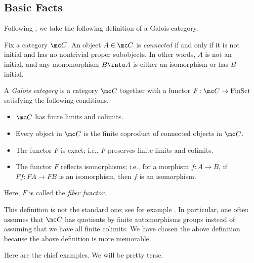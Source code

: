 \documentclass{amsart}
\begin{document}
\subsection{Basic Facts}
Following \cite[\href{https://stacks.math.columbia.edu/tag/0BMY}{Definition 0BMY}]{stacks}, we take the following definition of a Galois category.
\begin{definition}[connected]
    Fix a category $\mc C$. An object $A\in\mc C$ is \textit{connected} if and only if it is not initial and has no nontrivial proper subobjects. In other words, $A$ is not an initial, and any monomorphism $B\into A$ is either an isomorphism or has $B$ initial.
\end{definition}
\begin{definition} \label{def:galois-cat}
    A \textit{Galois category} is a category $\mc C$ together with a functor $F\colon\mc C\to\mathrm{FinSet}$ satisfying the following conditions.
    \begin{itemize}
        \item $\mc C$ has finite limits and colimits.
        \item Every object in $\mc C$ is the finite coproduct of connected objects in $\mc C$.
        \item The functor $F$ is exact; i.e., $F$ preserves finite limits and colimits.
        \item The functor $F$ reflects isomorphisms; i.e., for a morphism $f\colon A\to B$, if $Ff\colon FA\to FB$ is an isomorphism, then $f$ is an isomorphism.
    \end{itemize}
    Here, $F$ is called the \textit{fiber functor}.
\end{definition}
\begin{remark}
    This definition is not the standard one; see for example \cite[Definition~2.1]{cadoret-galois}. In particular, one often assumes that $\mc C$ has quotients by finite automorphisms groups instead of assuming that we have all finite colimits.
    We have chosen the above definition because the above definition is more memorable.
\end{remark}
Here are the chief examples. We will be pretty terse.
\end{document}
